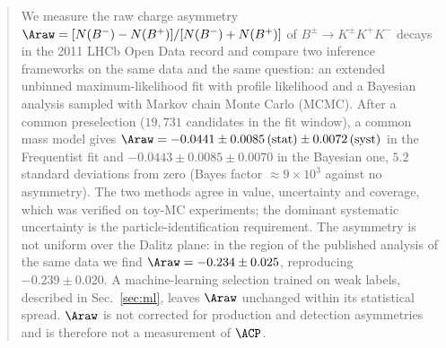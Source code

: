 \begin{abstract}
We measure the raw charge asymmetry $\Araw=[N(B^-)-N(B^+)]/[N(B^-)+N(B^+)]$ of $B^{\pm}\to K^{\pm}K^{+}K^{-}$ decays in the 2011 LHCb Open Data record and compare two inference frameworks on the same data and the same question: an extended unbinned maximum-likelihood fit with profile likelihood and a Bayesian analysis sampled with Markov chain Monte Carlo (MCMC). After a common preselection ($19{,}731$ candidates in the fit window), a common mass model gives $\Araw=-0.0441\pm0.0085\,(\text{stat})\pm0.0072\,(\text{syst})$ in the Frequentist fit and $-0.0443\pm0.0085\pm0.0070$ in the Bayesian one, $5.2$ standard deviations from zero (Bayes factor $\approx9\times10^3$ against no asymmetry). The two methods agree in value, uncertainty and coverage, which was verified on toy-MC experiments; the dominant systematic uncertainty is the particle-identification requirement. The asymmetry is not uniform over the Dalitz plane: in the region of the published analysis of the same data we find $\Araw=-0.234\pm0.025$, reproducing $-0.239\pm0.020$. A machine-learning selection trained on weak labels, described in Sec.~\ref{sec:ml}, leaves $\Araw$ unchanged within its statistical spread. $\Araw$ is not corrected for production and detection asymmetries and is therefore not a measurement of $\ACP$.
\end{abstract}
